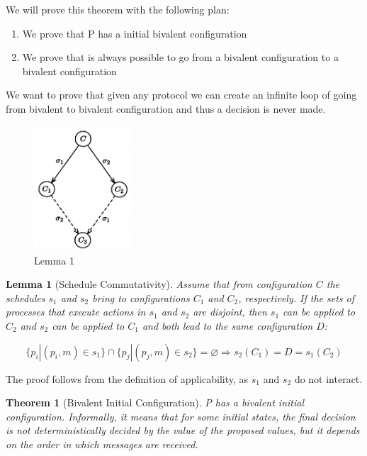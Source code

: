 \documentclass[a4paper,11pt,hidelinks]{article}
\newtheorem{theorem}{Theorem}
\newtheorem{lemma}{Lemma}[theorem]
\begin{document}
\noindent We will prove this theorem with the following plan:

\begin{enumerate}
    \item We prove that P has a initial bivalent configuration
    \item We prove that is always possible to go from a bivalent configuration to a bivalent configuration
\end{enumerate}

We want to prove that given any protocol we can create an infinite loop of going from bivalent to bivalent configuration and thus a decision is never made.

\begin{figure}[!h]
    \centering
    \includegraphics[width=0.33\textwidth]{drawable/fig1.png}
    \caption{Lemma 1}
    \label{fig1}
\end{figure}

\begin{lemma}[Schedule Commutativity]
    Assume that from configuration $C$ the schedules $s_1$ and $s_2$ bring to configurations $C_1$ and $C_2$, respectively. If the sets of processes that execute actions in $s_1$ and $s_2$ are disjoint, then $s_1$ can be applied to $C_2$ and $s_2$ can be applied to $C_1$ and both lead to the same configuration $D$:

    $$
        \{ p_i | (p_i, m) \in s_1\} \cap \{p_j | (p_j, m) \in s_2\} = \varnothing \Rightarrow s_2(C_1) = D = s_1(C_2)
    $$

\end{lemma}

The proof follows from the definition of applicability, as $s_1$ and $s_2$ do not interact.

\begin{theorem}[Bivalent Initial Configuration]
    P has a bivalent initial configuration. Informally, it means that for some initial states, the final decision is not deterministically decided by the value of the proposed values, but it depends on the order in which messages are received.
\end{theorem}
\end{document}

